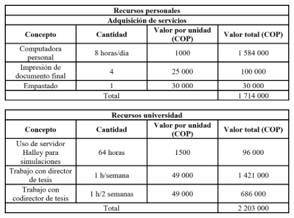 \documentclass[12pt]{report}
\begin{document}
\begin{center}
    \includegraphics[width=0.95\textwidth]{images/presupuesto.png}
\end{center}



\printbibliography
\end{document}
